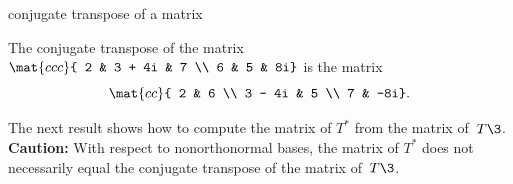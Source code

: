 \begin{example}{conjugate transpose of a\/  matrix}


The conjugate transpose of the  matrix
$
\mat{ccc}{
2 & 3 + 4i & 7 \\
6 & 5 & 8i}
$
is the  matrix
\vspace{-.06in} %
\[
\mat{cc}{
2 & 6 \\
3 - 4i & 5 \\
7 & -8i}.\\[0.05in]
\]
\end{example}

\pagebreak[3]


The next result shows how to compute the matrix of $T^*$ from the matrix of~$T\3$.
\textbf{Caution:} With respect to nonorthonormal bases, the matrix of $T^*$
does not necessarily equal the conjugate transpose of the matrix of~$T\3$.

